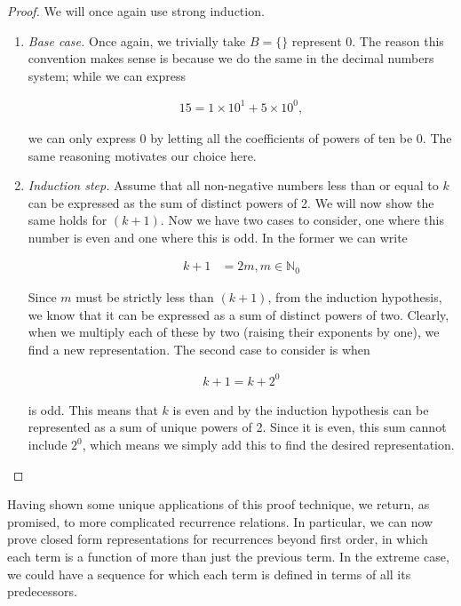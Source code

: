 \begin{proof}
	We will once again use strong induction.
	
	\vspace{\baselineskip}
	\begin{enumerate}
		\item \emph{Base case.} Once again, we trivially take $B = \{ \}$ represent 0. The reason this convention makes sense is because we do the same in the decimal numbers system; while we can express 
		
		\begin{align*}
			15 = 1 \times 10^1 + 5 \times 10^0,
		\end{align*}
		
		we can only express 0 by letting all the coefficients of powers of ten be 0. The same reasoning motivates our choice here.
		
		\item \emph{Induction step.} Assume that all non-negative numbers less than or equal to $k$ can be expressed as the sum of distinct powers of 2. We will now show the same holds for $(k + 1)$. Now we have two cases to consider, one where this number is even and one where this is odd. In the former we can write
		
		\begin{align*}
			k + 1 &= 2m, m \in \mathbb{N}_0
		\end{align*}
		
		Since $m$ must be strictly less than $(k + 1)$, from the induction hypothesis, we know that it can be expressed as a sum of distinct powers of two. Clearly, when we multiply each of these by two (raising their exponents by one), we find a new representation. The second case to consider is when
		
		\begin{align*}
			k + 1 = k + 2^0
		\end{align*}
		
		is odd. This means that $k$ is even and by the induction hypothesis can be represented as a sum of unique powers of 2. Since it is even, this sum cannot include $2^0$, which means we simply add this to find the desired representation.
	\end{enumerate}
\end{proof}
\vspace{\baselineskip}

Having shown some unique applications of this proof technique, we return, as promised, to more complicated recurrence relations. In particular, we can now prove closed form representations for recurrences beyond first order, in which each term is a function of more than just the previous term. In the extreme case, we could have a sequence for which each term is defined in terms of all its predecessors.


